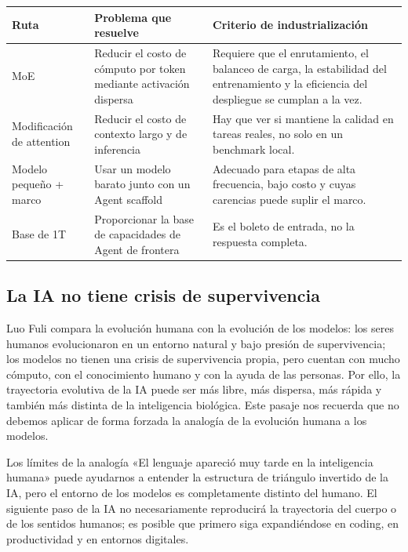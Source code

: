 \documentclass[a4paper]{article}
\begin{document}
\noindent\begin{tabularx}{\textwidth}{p{}p{}X}
\toprule
Ruta & Problema que resuelve & Criterio de industrialización \\
\midrule
MoE & Reducir el costo de cómputo por token mediante activación dispersa & Requiere que el enrutamiento, el balanceo de carga, la estabilidad del entrenamiento y la eficiencia del despliegue se cumplan a la vez. \\
Modificación de attention & Reducir el costo de contexto largo y de inferencia & Hay que ver si mantiene la calidad en tareas reales, no solo en un benchmark local. \\
Modelo pequeño + marco & Usar un modelo barato junto con un Agent scaffold & Adecuado para etapas de alta frecuencia, bajo costo y cuyas carencias puede suplir el marco. \\
Base de 1T & Proporcionar la base de capacidades de Agent de frontera & Es el boleto de entrada, no la respuesta completa. \\
\bottomrule
\end{tabularx}

\subsection{La IA no tiene crisis de supervivencia}

Luo Fuli compara la evolución humana con la evolución de los modelos: los seres humanos evolucionaron en un entorno natural y bajo presión de supervivencia; los modelos no tienen una crisis de supervivencia propia, pero cuentan con mucho cómputo, con el conocimiento humano y con la ayuda de las personas. Por ello, la trayectoria evolutiva de la IA puede ser más libre, más dispersa, más rápida y también más distinta de la inteligencia biológica. Este pasaje nos recuerda que no debemos aplicar de forma forzada la analogía de la evolución humana a los modelos.

\begin{knowledgebox}{Los límites de la analogía}
«El lenguaje apareció muy tarde en la inteligencia humana» puede ayudarnos a entender la estructura de triángulo invertido de la IA, pero el entorno de los modelos es completamente distinto del humano. El siguiente paso de la IA no necesariamente reproducirá la trayectoria del cuerpo o de los sentidos humanos; es posible que primero siga expandiéndose en coding, en productividad y en entornos digitales.
\end{knowledgebox}
\end{document}
